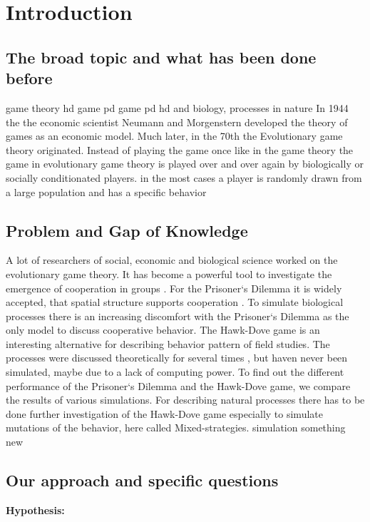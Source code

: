 \section{Introduction}

\subsection{The broad topic and what has been done before}

game theory
hd game
pd game 
pd hd and biology, processes in nature
In 1944 the the economic scientist Neumann and Morgenstern developed the theory of games as an economic model. Much later, in the 70th the Evolutionary game theory originated. Instead of playing the game once like in the game theory the game in evolutionary game theory is played over and over again by biologically or socially conditionated players. in the most cases a player is randomly drawn from a large population and has a specific behavior \citep{weibull1997}
\subsection{Problem and Gap of Knowledge}
A lot of researchers of social, economic and biological science worked on the evolutionary game theory. It has become a powerful tool to investigate the emergence of cooperation in groups \citep{HauertandDoebeli2004}. For the Prisoner`s Dilemma it is widely accepted, that spatial structure supports cooperation \citep{margules2000}. To simulate biological processes there is an increasing discomfort with the Prisoner`s Dilemma as the only model to discuss cooperative behavior. The Hawk-Dove game is an interesting alternative for describing behavior pattern of field studies\citep{pressey1994}. The processes were discussed theoretically for several times \citep{margules2000, pressey1994}, but haven never been simulated, maybe due to a lack of computing power.  To find out the different performance of  the Prisoner`s Dilemma and  the  Hawk-Dove game, we compare the results of various simulations. For describing natural processes there has to be done further investigation of the Hawk-Dove game especially to simulate mutations of the behavior, here called Mixed-strategies. 
simulation something new

\subsection{Our approach and specific questions}
\textbf{Hypothesis:}

